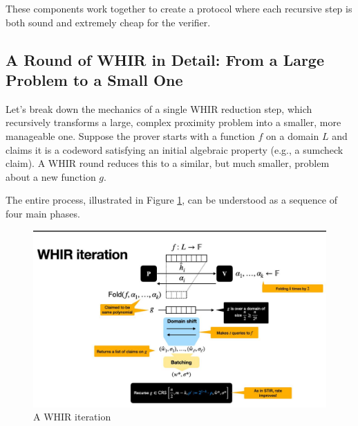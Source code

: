 \documentclass{article}
\begin{document}
These components work together to create a protocol where each recursive step is both sound and extremely cheap for the verifier.

\subsection{A Round of WHIR in Detail: From a Large Problem to a Small One}

Let's break down the mechanics of a single WHIR reduction step, which recursively transforms a large, complex proximity problem into a smaller, more manageable one. Suppose the prover starts with a function $f$ on a domain $L$ and claims it is a codeword satisfying an initial algebraic property (e.g., a sumcheck claim). A WHIR round reduces this to a similar, but much smaller, problem about a new function $g$.

The entire process, illustrated in Figure \ref{fig:whir_iteration}, can be understood as a sequence of four main phases.

\begin{figure}[h!]
    \centering
    \includegraphics[width=1.\textwidth]{img/whir_iteration.jpg}
    \caption{A WHIR iteration}
    \label{fig:whir_iteration}
\end{figure}
\end{document}

